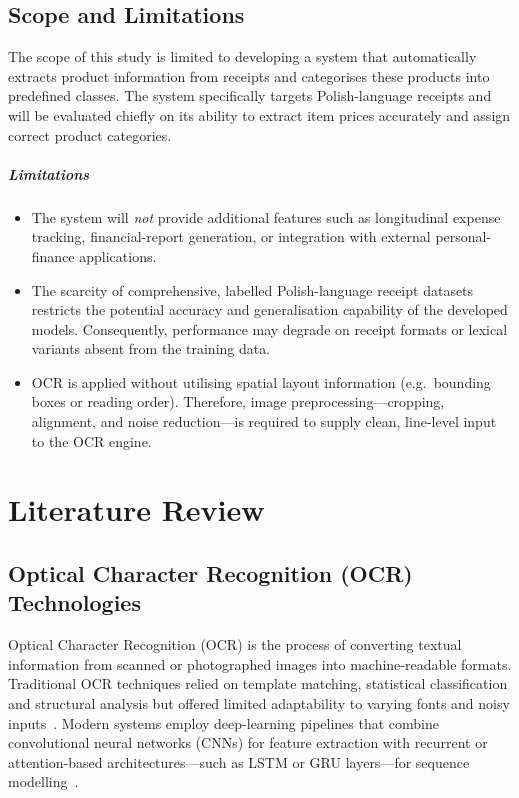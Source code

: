 \documentclass{SGGW-thesis-EN}
\begin{document}
\section{Scope and Limitations}
The scope of this study is limited to developing a system that automatically extracts product information
from receipts and categorises these products into predefined classes.
The system specifically targets Polish-language receipts and will be evaluated chiefly on its ability to
extract item prices accurately and assign correct product categories.

\paragraph{Limitations}

\begin{itemize}
  \item The system will \emph{not} provide additional features such as longitudinal expense tracking,
        financial-report generation, or integration with external personal-finance applications.
  \item The scarcity of comprehensive, labelled Polish-language receipt datasets restricts the potential
        accuracy and generalisation capability of the developed models.
        Consequently, performance may degrade on receipt formats or lexical variants absent from the
        training data.
  \item OCR is applied without utilising spatial layout information (e.g.\ bounding boxes or reading order).
        Therefore, image preprocessing—cropping, alignment, and noise reduction—is required to supply
        clean, line-level input to the OCR engine.
\end{itemize}


\chapter{Literature Review}

\section{Optical Character Recognition (OCR) Technologies}

Optical Character Recognition (OCR) is the process of converting textual information
from scanned or photographed images into machine-readable formats.
Traditional OCR techniques relied on template matching, statistical classification and
structural analysis but offered limited adaptability to varying fonts and noisy inputs~\cite{ocrsystems}.
Modern systems employ deep-learning pipelines that combine convolutional neural networks
(CNNs) for feature extraction with recurrent or attention-based architectures—such as
LSTM or GRU layers—for sequence modelling~\cite{shi2016endtoend}.
\end{document}
